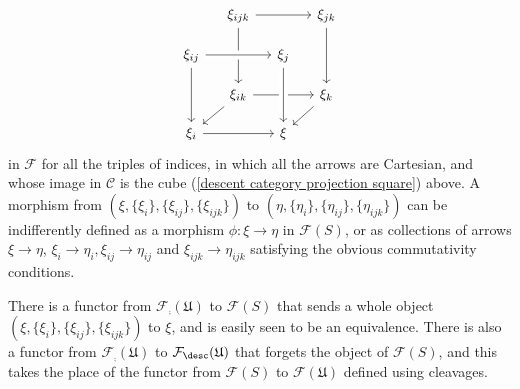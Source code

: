 \begin{remark}
\[\begin{tikzcd}[row sep=4mm,column sep=4mm]
&\xi_{ijk}\ar[rr]\ar[dd]&&\xi_{jk}\ar[dd]\\
\xi_{ij}\ar[dd]\ar[rr,crossing over]&&\xi_j&\\
&\xi_{ik}\ar[ld]\ar[rr]&&\xi_k\ar[ld]\\
\xi_i\ar[rr]&&\xi
\arrow[from=2-3,to=4-3,crossing over]
\end{tikzcd}\]
in $\mathcal{F}$ for all the triples of indices, in which all the arrows are Cartesian, and whose image in $\mathcal{C}$ is the cube (\ref{descent category projection square}) above. A morphism from $(\xi,\{\xi_i\},\{\xi_{ij}\},\{\xi_{ijk}\})$ to $(\eta,\{\eta_i\},\{\eta_{ij}\},\{\eta_{ijk}\})$ can be indifferently defined as a morphism $\phi:\xi\to\eta$ in $\mathcal{F}(S)$, or as collections of arrows $\xi\to\eta$, $\xi_i\to\eta_i,\xi_{ij}\to\eta_{ij}$ and $\xi_{ijk}\to\eta_{ijk}$ satisfying the obvious commutativity conditions.\par
There is a functor from $\mathcal{F}_{\comp}(\mathfrak{U})$ to $\mathcal{F}(S)$ that sends a whole object $(\xi,\{\xi_i\},\{\xi_{ij}\},\{\xi_{ijk}\})$ to $\xi$, and is easily seen to be an equivalence. There is also a functor from $\mathcal{F}_{\comp}(\mathfrak{U})$ to $\mathcal{F}_{\desc}(\mathfrak{U})$ that forgets the object of $\mathcal{F}(S)$, and this takes the place of the functor from $\mathcal{F}(S)$ to $\mathcal{F}(\mathfrak{U})$ defined using cleavages.
\end{remark}

